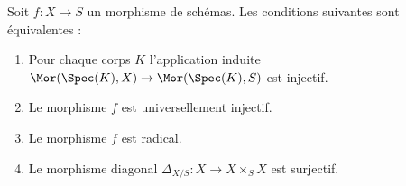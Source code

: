 \begin{lemma}
\label{lemma-universally-injective}
\begin{reference}
\cite[Proposition 3.7.1]{EGA1-second}
\end{reference}
Soit $f : X \to S$ un morphisme de schémas. Les conditions
suivantes sont équivalentes :
\begin{enumerate}
\item Pour chaque corps $K$ l'application
induite $\Mor(\Spec(K), X) \to \Mor(\Spec(K), S)$ est
injectif.
\item Le morphisme $f$ est universellement injectif.
\item Le morphisme $f$ est radical.
\item Le morphisme diagonal $\Delta_{X/S} : X \longrightarrow X \times_S X$ est
surjectif.
\end{enumerate}
\end{lemma}

